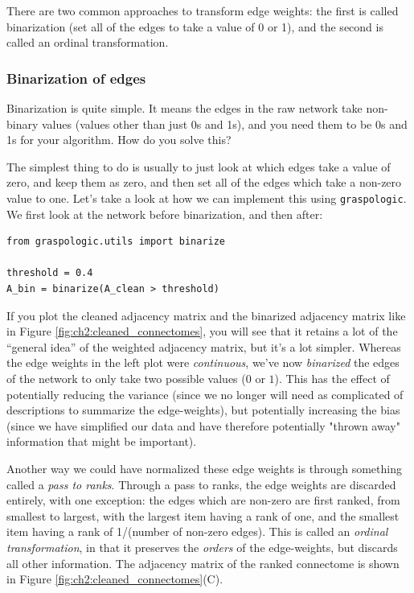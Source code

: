 There are two common approaches to transform edge weights: the first is called binarization (set all of the edges to take a value of 0 or 1), and the second is called an ordinal transformation. 

\subsubsection*{Binarization of edges} 

Binarization is quite simple. It means the edges in the raw network take non-binary values (values other than just 0s and 1s), and you need them to be 0s and 1s for your algorithm. How do you solve this? 

The simplest thing to do is usually to just look at which edges take a value of zero, and keep them as zero, and then set all of the edges which take a non-zero value to one. Let's take a look at how we can implement this using \texttt{graspologic}. We first look at the network before binarization, and then after:

\begin{lstlisting}[style=python]
from graspologic.utils import binarize

threshold = 0.4
A_bin = binarize(A_clean > threshold)
\end{lstlisting}

If you plot the cleaned adjacency matrix and the binarized adjacency matrix like in Figure \ref{fig:ch2:cleaned_connectomes}, you will see that it retains a lot of the ``general idea'' of the weighted adjacency matrix, but it's a lot simpler. Whereas the edge weights in the left plot were \emph{continuous}, we've now \emph{binarized} the edges of the network to only take two possible values ($0$ or $1$). This has the effect of potentially reducing the variance (since we no longer will need as complicated of descriptions to summarize the edge-weights), but potentially increasing the bias (since we have simplified our data and have therefore potentially "thrown away" information that might be important).

Another way we could have normalized these edge weights is through something called a \emph{pass to ranks}. Through a pass to ranks, the edge weights are discarded entirely, with one exception: the edges which are non-zero are first ranked, from smallest to largest, with the largest item having a rank of one, and the smallest item having a rank of 1/(number of non-zero edges). This is called an \emph{ordinal transformation}, in that it preserves the \emph{orders} of the edge-weights, but discards all other information. The adjacency matrix of the ranked connectome is shown in Figure \ref{fig:ch2:cleaned_connectomes}(C).

